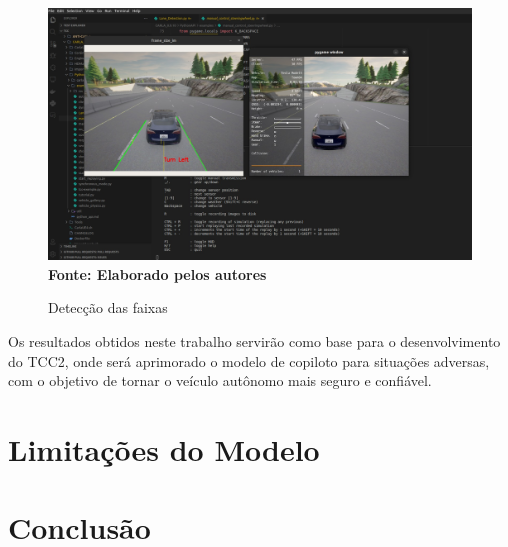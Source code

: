 \documentclass[a4paper,12pt,Times]{article}
\begin{document}
\begin{figure}[H]
    \centering
    \caption{Detecção das faixas}
    \includegraphics[scale=0.25]{figuras/Lane-detect.jpeg}\captionsetup{justification=centering}
  \vspace{-0.2cm}
     \\\textbf{\footnotesize Fonte: Elaborado pelos autores}
    \label{fig:lane-detect3}
\end{figure}

Os resultados obtidos neste trabalho servirão como base para o desenvolvimento do TCC2, onde será aprimorado o modelo de copiloto para situações adversas, com o objetivo de tornar o veículo autônomo mais seguro e confiável.


\section{Limitações do Modelo}

\section{Conclusão}




 
 



\iffalse
 \newpage
 \singlespace{
 
 
 }
\end{document}
